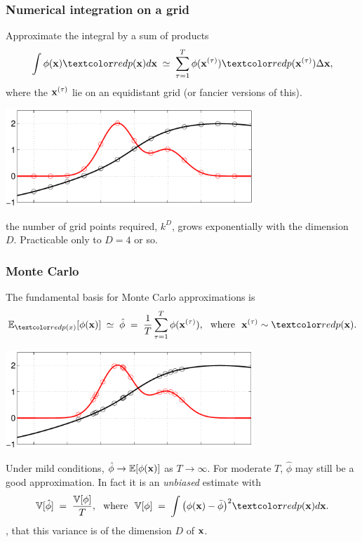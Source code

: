 \begin{frame}
\frametitle{Numerical integration on a grid}

Approximate the integral by a sum of products
\[
\int \phi(\bfx)\Red{p(\bfx)}d\bfx\;\simeq\;\sum_{\tau=1}^T\phi(\bfx^{(\tau)})\Red{p(\bfx^{(\tau)})}\Delta\bfx,
\]
where the $\mathbf x^{(\tau)}$ lie on an equidistant grid (or fancier
versions of this).

\centerline{\includegraphics[width=0.7\textwidth]{mc1}}

 the number of grid points required, $k^D$, grows
exponentially with the dimension $D$. Practicable only to $D=4$ or so.
\end{frame}


\begin{frame}
\frametitle{Monte Carlo}

The fundamental basis for Monte Carlo approximations is
\[
\E_{\Red{p(x)}}[\phi(\bfx)]\;\simeq\;\hat\phi\;=\;\frac{1}{T}\sum_{\tau=1}^T\phi(\bfx^{(\tau)}),
\text{\ \ where\ \ }\bfx^{(\tau)}\sim \Red{p(\bfx)}.
\]

\centerline{\includegraphics[width=0.7\textwidth]{mc4}}

Under mild conditions, $\hat\phi\rightarrow\mathbb{E}[\phi(\mathbf x)]$ as
$T\rightarrow\infty$. For moderate $T$, $\hat\phi$ may still be a good
approximation. In fact it is an \emph{unbiased} estimate with
\[
\V[\hat\phi]\;=\;\frac{\V[\phi]}{T}, \text{\ \ where\ \ }
\V[\phi]\;=\;\int \big(\phi(\bfx)-\bar\phi\big)^2\Red{p(\bfx)}d\bfx.
\]
, that this variance is  of the dimension
$D$ of $\mathbf x$.
\end{frame}


